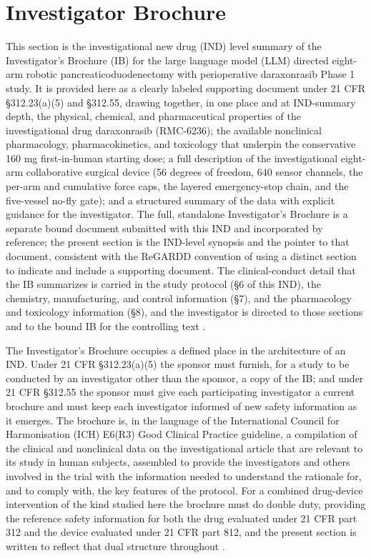 \section{Investigator Brochure}

This section is the investigational new drug (IND) level summary of the
Investigator's Brochure (IB) for the large language model (LLM) directed eight-arm
robotic pancreaticoduodenectomy with perioperative daraxonrasib Phase 1 study. It is
provided here as a clearly labeled supporting document under 21 CFR
\S 312.23(a)(5) and \S 312.55, drawing together, in one place and at IND-summary
depth, the physical, chemical, and pharmaceutical properties of the
investigational drug daraxonrasib (RMC-6236); the available nonclinical
pharmacology, pharmacokinetics, and toxicology that underpin the conservative
160 mg first-in-human starting dose; a full description of the investigational
eight-arm collaborative surgical device (56 degrees of freedom, 640 sensor
channels, the per-arm and cumulative force caps, the layered emergency-stop chain,
and the five-vessel no-fly gate); and a structured summary of the data with
explicit guidance for the investigator. The full, standalone Investigator's
Brochure is a separate bound document submitted with this IND and incorporated by
reference; the present section is the IND-level synopsis and the pointer to that
document, consistent with the ReGARDD convention of using a distinct section to
indicate and include a supporting document. The clinical-conduct detail that the
IB summarizes is carried in the study protocol (\S 6 of this IND), the chemistry,
manufacturing, and control information (\S 7), and the pharmacology and
toxicology information (\S 8), and the investigator is directed to those sections
and to the bound IB for the controlling text \cite{phase1guidance,daraxwhipple}.

The Investigator's Brochure occupies a defined place in the architecture of an
IND. Under 21 CFR \S 312.23(a)(5) the sponsor must furnish, for a study to be
conducted by an investigator other than the sponsor, a copy of the IB; and under
21 CFR \S 312.55 the sponsor must give each participating investigator a current
brochure and must keep each investigator informed of new safety information as it
emerges. The brochure is, in the language of the International Council for
Harmonisation (ICH) E6(R3) Good Clinical Practice guideline, a compilation of the
clinical and nonclinical data on the investigational article that are relevant to
its study in human subjects, assembled to provide the investigators and others
involved in the trial with the information needed to understand the rationale for,
and to comply with, the key features of the protocol. For a combined drug-device
intervention of the kind studied here the brochure must do double duty, providing
the reference safety information for both the drug evaluated under 21 CFR part 312
and the device evaluated under 21 CFR part 812, and the present section is written
to reflect that dual structure throughout \cite{ichpaistduni,cfr312paiuni}.

